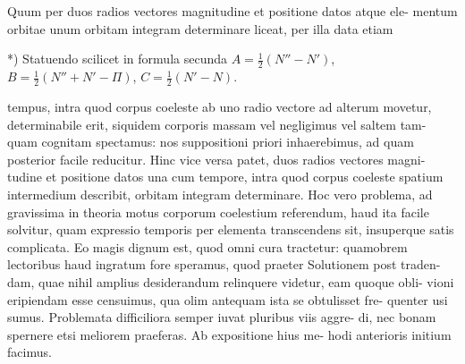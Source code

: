 \documentclass[12pt,a4paper]{article}
\begin{document}
\section{}

Quum per duos radios vectores magnitudine et positione datos atque ele-
mentum orbitae unum orbitam integram determinare liceat, per illa data etiam
\begin{flushright}
\small\begin{minipage}{0.85\textwidth}
\raggedleft
*) Statuendo scilicet in formula secunda $A = \tfrac{1}{2}(N'' - N')$, $B = \tfrac{1}{2}(N'' + N' - \Pi)$, $C = \tfrac{1}{2}(N' - N)$.
\end{minipage}
\end{flushright}
\vspace{0.5em}

\noindent tempus, intra quod corpus coeleste ab uno radio vectore ad alterum movetur,
determinabile erit, siquidem corporis massam vel negligimus vel saltem tam-
quam cognitam spectamus: nos suppositioni priori inhaerebimus, ad quam
posterior facile reducitur. Hinc vice versa patet, duos radios vectores magni-
tudine et positione datos una cum tempore, intra quod corpus coeleste spatium
intermedium describit, orbitam integram determinare. Hoc vero problema, ad
gravissima in theoria motus corporum coelestium referendum, haud ita facile
solvitur, quam expressio temporis per elementa transcendens sit, insuperque
satis complicata. Eo magis dignum est, quod omni cura tractetur: quamobrem
lectoribus haud ingratum fore speramus, quod praeter Solutionem post traden-
dam, quae nihil amplius desiderandum relinquere videtur, eam quoque obli-
vioni eripiendam esse censuimus, qua olim antequam ista se obtulisset fre-
quenter usi sumus. Problemata difficiliora semper iuvat pluribus viis aggre-
di, nec bonam spernere etsi meliorem praeferas. Ab expositione hius me-	hodi anterioris initium facimus.

\section{}
\end{document}
